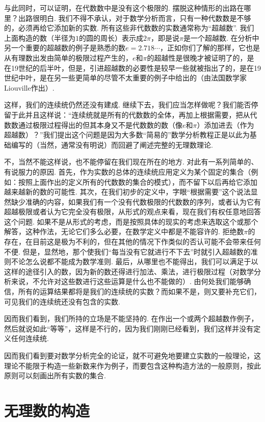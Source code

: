 \documentclass[color=cyan,mathpazo,titlestyle=hang]{elegantbook_mac}
\begin{document}
与此同时，可以证明，在代数数中是没有这个极限的. 摆脱这种情形的出路在哪里？出路很明白. 我们不得不承认，对于数学分析而言，只有一种代数数是不够的，必须再给它添加新的实数. 所有这些非代数数的实数通常称为``超越数''. 我们上面构造的数（半径为$1$的圆的周长）表示成$2\pi$，即是说$\pi$是一个超越数. 在分析中另一个重要的超越数的例子是熟悉的数$e=2.718\cdots$，正如你们了解的那样，它也是从有理数出发由简单的极限过程产生的，$e$和$\pi$的超越性是很晚才被证明了的，是在19世纪的后半叶，但是，引进超越数的必要性是较早一些就被指出了的，是在19世纪中叶，是在另一些更简单的尽管不太重要的例子中给出的（由法国数学家Liouville作出）. 

这样，我们的连续统仍然还没有建成. 继续下去，我们应当怎样做呢？我们能否停留于此并且这样说：``连续统就是所有的代数数的全体，再加上根据需要，把从代数数通过极限过程得出的但其本身又不是代数数的数（像$e$和$\pi$）添加进去（作为超越数）？''我们提出这个问题是因为大多数``简易的''数学分析教程正是以此为基础编写的（当然，通常没有明说）而回避了阐述完整的无理数理论. 

不，当然不能这样说，也不能停留在我们现在所在的地方. 对此有一系列简单的、有说服力的原因. 首先，作为实数的总体的连续统应用定义为某个固定的集合（例如：按照上面作出的定义所有的代数数的集合的模式），而不留下以后再给它添加越来越新的数的可能性. 其次，在我们初步的定义中，字眼``根据需要''这个说法显然缺少准确的内容，如果我们有一个没有代数极限的代数数的序列，或者认为它有超越极限或者认为它完全没有极限，从形式的观点来看，现在我们有权任意地回答这个问题. 如果不是从形式的考虑，而是按照具体的现实的考虑来选取这个或那个解答，这种作法，无论它们多么必要，在数学定义中都是不能容许的. 拒绝数$\pi$的存在，在目前这是极为不利的，但在其他的情况下作类似的否认可能不会带来任何不便. 但是，显然地，那个使我们``每当没有它就进行不下去''时就引入超越数的准则不论怎么说都不能成为数学准则. 最后，从哪里也不能得出，我们可以满足于以这样的途径引入的数，因为新的数还得进行加法、乘法，进行极限过程（对数学分析来说，不允许对这些数进行这些运算是什么也不能做的）. 由何处我们能够确信，所有的运算结果都将是我们的连续统的实数？而如果不是，则又要补充它们，可见我们的连续统还没有包含的实数. 

因而我们看到，我们所持的立场是不能坚持的. 在作出一个或两个超越数作例子，然后就说如此``等等''，这样是不行的，因为我们刚刚已经看到，我们这样并没有定义任何连续统. 

因而我们看到要对数学分析完全的论证，就不可避免地要建立实数的一般理论，这理论不能限于构造一些新数来作为例子，而要包含这种构造方法的一般原则，按此原则可以刻画出所有实数的集合. 

\section{无理数的构造}
\end{document}
